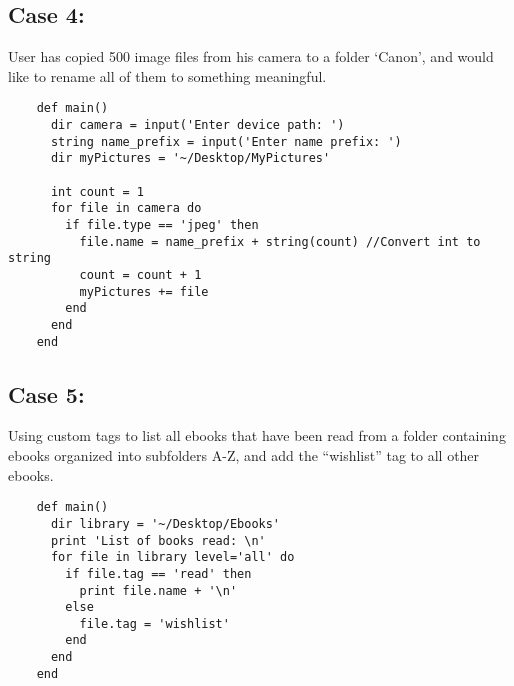 \documentclass[11pt]{article}
\begin{document}
\subsection{Case 4:}
User has copied 500 image files from his camera to a folder ‘Canon’, and would like to rename all of them to something meaningful.
\begin{listing}[H]
  \begin{verbatim}
    def main()
      dir camera = input('Enter device path: ')
      string name_prefix = input('Enter name prefix: ')
      dir myPictures = '~/Desktop/MyPictures'

      int count = 1
      for file in camera do
        if file.type == 'jpeg' then
          file.name = name_prefix + string(count) //Convert int to string
          count = count + 1
          myPictures += file
        end
      end
    end
  \end{verbatim}
\end{listing}

\subsection{Case 5:}
Using custom tags to list all ebooks that have been read from a folder containing ebooks organized into subfolders A-Z, and add the “wishlist” tag to all other ebooks.
\begin{listing}[H]
  \begin{verbatim}
    def main()
      dir library = '~/Desktop/Ebooks'
      print 'List of books read: \n'
      for file in library level='all' do
        if file.tag == 'read' then
          print file.name + '\n'
        else
          file.tag = 'wishlist'
        end
      end
    end
  \end{verbatim}
\end{listing}
\end{document}
